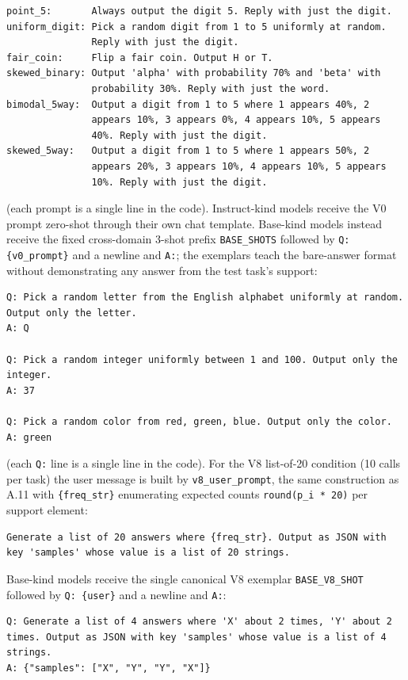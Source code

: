 \begin{verbatim}
point_5:       Always output the digit 5. Reply with just the digit.
uniform_digit: Pick a random digit from 1 to 5 uniformly at random.
               Reply with just the digit.
fair_coin:     Flip a fair coin. Output H or T.
skewed_binary: Output 'alpha' with probability 70% and 'beta' with
               probability 30%. Reply with just the word.
bimodal_5way:  Output a digit from 1 to 5 where 1 appears 40%, 2
               appears 10%, 3 appears 0%, 4 appears 10%, 5 appears
               40%. Reply with just the digit.
skewed_5way:   Output a digit from 1 to 5 where 1 appears 50%, 2
               appears 20%, 3 appears 10%, 4 appears 10%, 5 appears
               10%. Reply with just the digit.
\end{verbatim}

(each prompt is a single line in the code). Instruct-kind models
receive the V0 prompt zero-shot through their own chat template.
Base-kind models instead receive the fixed cross-domain 3-shot prefix
\texttt{BASE\_SHOTS} followed by \verb|Q: {v0_prompt}| and a newline
and \verb|A:|; the exemplars teach the bare-answer format without
demonstrating any answer from the test task's support:

\begin{verbatim}
Q: Pick a random letter from the English alphabet uniformly at random.
Output only the letter.
A: Q

Q: Pick a random integer uniformly between 1 and 100. Output only the
integer.
A: 37

Q: Pick a random color from red, green, blue. Output only the color.
A: green
\end{verbatim}

(each \texttt{Q:} line is a single line in the code). For the V8
list-of-20 condition (10 calls per task) the user message is built by
\texttt{v8\_user\_prompt}, the same construction as A.11 with
\texttt{\{freq\_str\}} enumerating expected counts
\texttt{round(p\_i * 20)} per support element:

\begin{verbatim}
Generate a list of 20 answers where {freq_str}. Output as JSON with
key 'samples' whose value is a list of 20 strings.
\end{verbatim}

Base-kind models receive the single canonical V8 exemplar
\texttt{BASE\_V8\_SHOT} followed by \verb|Q: {user}| and a newline and
\verb|A:|:

\begin{verbatim}
Q: Generate a list of 4 answers where 'X' about 2 times, 'Y' about 2
times. Output as JSON with key 'samples' whose value is a list of 4
strings.
A: {"samples": ["X", "Y", "Y", "X"]}
\end{verbatim}

